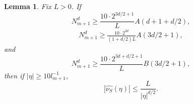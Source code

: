 \documentclass[12pt,reqno]{article}
\numberwithin{equation}{section}
\newtheorem{lemma}[theorem]{Lemma}
\begin{document}
\begin{lemma} \label{largeFrequencyLemma}
    Fix $L > 0$. If
    \begin{equation} \label{equation129041902412901290129}
        N_{m+1}^d \geq \frac{10 \cdot 2^{3d/2+1}}{L} A(d + 1 + d/2),
    \end{equation}
    \begin{equation} \label{equation190512919204912901}
    \begin{split}
        N_{m+1}^d \geq \frac{10 \cdot 2^{3d}}{(1 + d/2) L} A(3d/2 + 1),
    \end{split}
    \end{equation}
    and
    \begin{equation} \label{equation68943893493849}
        N_{m+1}^d \geq \frac{10 \cdot 2^{3d + d/2 + 1}}{L} B(3d/2 + 1),
    \end{equation}
    then if $|\eta| \geq 10l_{m+1}^{-1}$,
    \[ |\widehat{\nu_S}(\eta)| \leq \frac{L}{|\eta|^{d/2}}. \]
\end{lemma}
\end{document}
